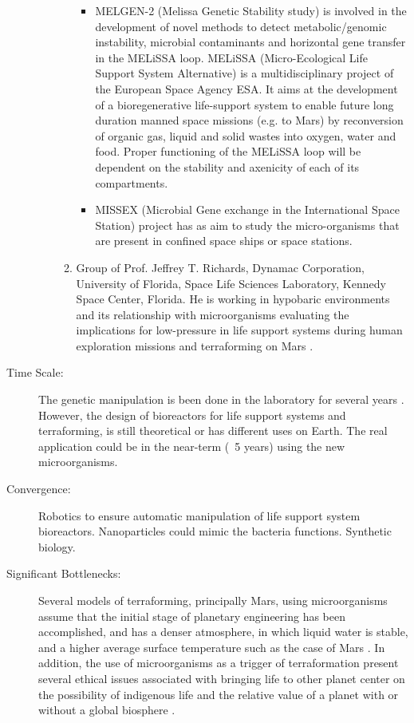 \begin{description}
\begin{enumerate}
\begin{enumerate}
\begin{itemize}
\item  MELGEN-2 (Melissa Genetic   Stability study) is involved in the
development   of novel methods to detect metabolic/genomic instability,
microbial  contaminants and  horizontal gene transfer in the MELiSSA
loop.  MELiSSA (Micro-Ecological  Life Support System Alternative) is a
multidisciplinary   project of the European Space Agency ESA. It aims at
the  development of a  bioregenerative life-support system to enable
future  long duration manned space  missions (e.g. to Mars) by
reconversion   of organic gas, liquid and solid wastes into oxygen,
water  and food. Proper functioning  of the MELiSSA loop will be
dependent   on the stability and axenicity of each of its compartments.
 
\item  MISSEX (Microbial Gene  exchange  in the International Space
Station)   project has as aim to study the micro-organisms that are
present  in confined space ships or  space stations.
\end{itemize}

\item Group of Prof. Jeffrey T. Richards, Dynamac Corporation, University
of  Florida, Space Life Sciences  Laboratory, Kennedy Space Center,
Florida.   He is working in hypobaric environments and its relationship
with  microorganisms evaluating the  implications for low-pressure in
life   support systems during human exploration missions and
terraforming  on Mars \cite{Richards2006}.
\end{enumerate}
\end{enumerate}
\renewcommand{\labelenumi}{(\alph{enumi}}
\item[Time  Scale:] The genetic  manipulation is been done in the laboratory
for  several years  \cite{Stellwag1986}.  However, the design
of bioreactors for life support   systems and terraforming, is still
theoretical   or has different uses on Earth. The real application could
be  in the near-term (~5 years)  using the new microorganisms.
 
\item[Convergence:]  Robotics to  ensure automatic manipulation of life support
system  bioreactors. Nanoparticles  could mimic the bacteria functions.
Synthetic   biology.
 
\item[Significant  Bottlenecks:]  Several models of terraforming, principally
Mars,  using microorganisms assume  that the initial stage of planetary
engineering   has been accomplished, and has a denser atmosphere, in
which  liquid water is stable, and a  higher average surface temperature
such  as  the case of Mars \cite{McKay2001}.
In  addition, the use of  microorganisms as a trigger of terraformation
present  several ethical issues  associated with bringing life to other
planet   center on the possibility of indigenous life and the relative
value  of a planet with or without a  global biosphere \cite{Debus2008}.
\end{description}
 

